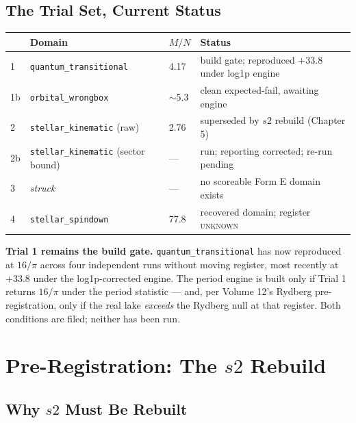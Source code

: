 \documentclass[11pt, letterpaper, openany]{book}
\newcommand{\MN}{M/N}
\begin{document}
\section{The Trial Set, Current Status}

\begin{table}[H]
\centering
\small
\begin{tabular}{@{}llll@{}}
\toprule
& \textbf{Domain} & \textbf{$\MN$} & \textbf{Status} \\
\midrule
1 & \texttt{quantum\_transitional} & 4.17 & build gate; reproduced $+33.8$ under log1p engine \\
1b & \texttt{orbital\_wrongbox} & $\sim$5.3 & clean expected-fail, awaiting engine \\
2 & \texttt{stellar\_kinematic} (raw) & 2.76 & superseded by $s2$ rebuild (Chapter 5) \\
2b & \texttt{stellar\_kinematic} (sector bound) & --- & run; reporting corrected; re-run pending \\
3 & \emph{struck} & --- & no scoreable Form E domain exists \\
4 & \texttt{stellar\_spindown} & 77.8 & recovered domain; register \textsc{unknown} \\
\bottomrule
\end{tabular}
\end{table}

\begin{predictionbox}
\textbf{Trial 1 remains the build gate.} \texttt{quantum\_transitional} has now reproduced at
$16/\pi$ across four independent runs without moving register, most recently at $+33.8$ under the
log1p-corrected engine. The period engine is built only if Trial 1 returns $16/\pi$ under the
period statistic --- and, per Volume 12's Rydberg pre-registration, only if the real lake
\emph{exceeds} the Rydberg null at that register. Both conditions are filed; neither has been run.
\end{predictionbox}

\chapter{Pre-Registration: The $s2$ Rebuild}

\section{Why $s2$ Must Be Rebuilt}
\end{document}

